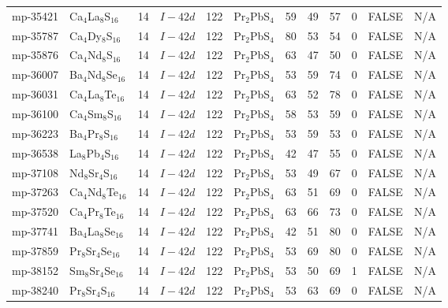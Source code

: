{\begin{longtable}{llcccccccccc}
    mp-35421 & Ca$_{4}$La$_{8}$S$_{16}$ & 14    & $I-42d$ & 122   & Pr$_{2}$PbS$_{4}$ & 59    & 49    & 57    & 0     & FALSE & N/A \\
    mp-35787 & Ca$_{4}$Dy$_{8}$S$_{16}$ & 14    & $I-42d$ & 122   & Pr$_{2}$PbS$_{4}$ & 80    & 53    & 54    & 0     & FALSE & N/A \\
    mp-35876 & Ca$_{4}$Nd$_{8}$S$_{16}$ & 14    & $I-42d$ & 122   & Pr$_{2}$PbS$_{4}$ & 63    & 47    & 50    & 0     & FALSE & N/A \\
    mp-36007 & Ba$_{4}$Nd$_{8}$Se$_{16}$ & 14    & $I-42d$ & 122   & Pr$_{2}$PbS$_{4}$ & 53    & 59    & 74    & 0     & FALSE & N/A \\
    mp-36031 & Ca$_{4}$La$_{8}$Te$_{16}$ & 14    & $I-42d$ & 122   & Pr$_{2}$PbS$_{4}$ & 63    & 52    & 78    & 0     & FALSE & N/A \\
    mp-36100 & Ca$_{4}$Sm$_{8}$S$_{16}$ & 14    & $I-42d$ & 122   & Pr$_{2}$PbS$_{4}$ & 58    & 53    & 59    & 0     & FALSE & N/A \\
    mp-36223 & Ba$_{4}$Pr$_{8}$S$_{16}$ & 14    & $I-42d$ & 122   & Pr$_{2}$PbS$_{4}$ & 53    & 59    & 53    & 0     & FALSE & N/A \\
    mp-36538 & La$_{8}$Pb$_{4}$S$_{16}$ & 14    & $I-42d$ & 122   & Pr$_{2}$PbS$_{4}$ & 42    & 47    & 55    & 0     & FALSE & N/A \\
    mp-37108 & Nd$_{8}$Sr$_{4}$S$_{16}$ & 14    & $I-42d$ & 122   & Pr$_{2}$PbS$_{4}$ & 53    & 49    & 67    & 0     & FALSE & N/A \\
    mp-37263 & Ca$_{4}$Nd$_{8}$Te$_{16}$ & 14    & $I-42d$ & 122   & Pr$_{2}$PbS$_{4}$ & 63    & 51    & 69    & 0     & FALSE & N/A \\
    mp-37520 & Ca$_{4}$Pr$_{8}$Te$_{16}$ & 14    & $I-42d$ & 122   & Pr$_{2}$PbS$_{4}$ & 63    & 66    & 73    & 0     & FALSE & N/A \\
    mp-37741 & Ba$_{4}$La$_{8}$Se$_{16}$ & 14    & $I-42d$ & 122   & Pr$_{2}$PbS$_{4}$ & 42    & 51    & 80    & 0     & FALSE & N/A \\
    mp-37859 & Pr$_{8}$Sr$_{4}$Se$_{16}$ & 14    & $I-42d$ & 122   & Pr$_{2}$PbS$_{4}$ & 53    & 69    & 80    & 0     & FALSE & N/A \\
    mp-38152 & Sm$_{8}$Sr$_{4}$Se$_{16}$ & 14    & $I-42d$ & 122   & Pr$_{2}$PbS$_{4}$ & 53    & 50    & 69    & 1     & FALSE & N/A \\
    mp-38240 & Pr$_{8}$Sr$_{4}$S$_{16}$ & 14    & $I-42d$ & 122   & Pr$_{2}$PbS$_{4}$ & 53    & 63    & 69    & 0     & FALSE & N/A \\

\end{longtable}}
